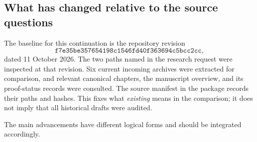 \documentclass[11pt,a4paper]{article}
\numberwithin{equation}{section}
\theoremstyle{definition}
\theoremstyle{remark}
\newcommand{\sourcecommit}{f7e35be357654198c1546fd40f363694c5bcc2cc}
\begin{document}
\subsection{What has changed relative to the source questions}

The baseline for this continuation is the repository revision
\[
\texttt{\sourcecommit},
\]
dated 11 October 2026. The two paths named
in the research request were inspected at that revision. Six current
incoming archives were extracted for comparison, and relevant canonical
chapters, the manuscript overview, and its proof-status records were
consulted. The source manifest in the package records their paths and
hashes. This fixes what \emph{existing} means in the comparison; it does
not imply that all historical drafts were audited.

The main advancements have different logical forms and should be
integrated accordingly.
\end{document}
